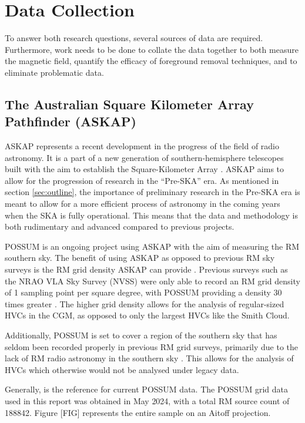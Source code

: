 \chapter{Data Collection}
\label{cha:data}

To answer both research questions, several sources of data are required. Furthermore, work needs to be done to collate the data together to both measure the magnetic field, quantify the efficacy of foreground removal techniques, and to eliminate problematic data.

\section{The Australian Square Kilometer Array Pathfinder (ASKAP)}
\label{sec:ASKAP}

ASKAP represents a recent development in the progress of the field of radio astronomy. It is a part of a new generation of southern-hemisphere telescopes built with the aim to establish the Square-Kilometer Array \citep{ID61, ID52}. ASKAP aims to allow for the progression of research in the “Pre-SKA” era. As mentioned in section \ref{sec:outline}, the importance of preliminary research in the Pre-SKA era is meant to allow for a more efficient process of astronomy in the coming years when the SKA is fully operational. This means that the data and methodology is both rudimentary and advanced compared to previous projects.


POSSUM is an ongoing project using ASKAP with the aim of measuring the RM southern sky. The benefit of using ASKAP as opposed to previous RM sky surveys is the RM grid density ASKAP can provide \citep{ID52, ID61}. Previous surveys such as the NRAO VLA Sky Survey (NVSS) were only able to record an RM grid density of 1 sampling point per square degree, with POSSUM providing a density 30 times greater \citep{ID1, ID52, ID61, ID18}. The higher grid density allows for the analysis of regular-sized HVCs in the CGM, as opposed to only the largest HVCs like the Smith Cloud.


Additionally, POSSUM is set to cover a region of the southern sky that has seldom been recorded properly in previous RM grid surveys, primarily due to the lack of RM radio astronomy in the southern sky \citep{ID44, ID45, ID52}. This allows for the analysis of HVCs which otherwise would not be analysed under legacy data.


Generally, \cite{ID52} is the reference for current POSSUM data. The POSSUM grid data used in this report was obtained in May 2024, with a total RM source count of 188842. Figure [FIG] represents the entire sample on an Aitoff projection.

